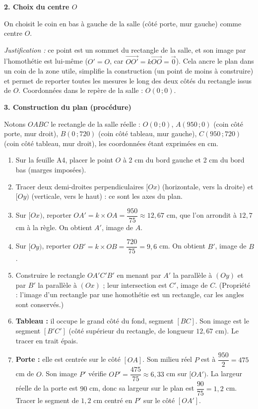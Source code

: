 \documentclass[11pt]{article}
\begin{document}
\begin{exoresolu}
\textbf{2. Choix du centre $O$}
\par On choisit le coin en bas à gauche de la salle (côté porte, mur gauche) comme centre $O$.
\par \emph{Justification :} ce point est un sommet du rectangle de la salle, et son image par l'homothétie est lui-même ($O' = O$, car $\overrightarrow{OO'} = k\overrightarrow{OO} = \vec{0}$). Cela \og ancre \fg{} le plan dans un coin de la zone utile, simplifie la construction (un point de moins à construire) et permet de reporter toutes les mesures le long des deux côtés du rectangle issus de $O$. Coordonnées dans le repère de la salle : $O(0\,;0)$.

\textbf{3. Construction du plan (procédure)}
\par Notons $OABC$ le rectangle de la salle réelle : $O(0\,;0)$, $A(950\,;0)$ (coin côté porte, mur droit), $B(0\,;720)$ (coin côté tableau, mur gauche), $C(950\,;720)$ (coin côté tableau, mur droit), les coordonnées étant exprimées en cm.
\begin{enumerate}
    \item Sur la feuille A4, placer le point $O$ à 2 cm du bord gauche et 2 cm du bord bas (marges imposées).
    \item Tracer deux demi-droites perpendiculaires $[Ox)$ (horizontale, vers la droite) et $[Oy)$ (verticale, vers le haut) : ce sont les axes du plan.
    \item Sur $[Ox)$, reporter $OA' = k \times OA = \dfrac{950}{75} \approx 12,67$ cm, que l'on arrondit à $12,7$ cm à la règle. On obtient $A'$, image de $A$.
    \item Sur $[Oy)$, reporter $OB' = k \times OB = \dfrac{720}{75} = 9,6$ cm. On obtient $B'$, image de $B$.
    \item Construire le rectangle $OA'C'B'$ en menant par $A'$ la parallèle à $(Oy)$ et par $B'$ la parallèle à $(Ox)$ ; leur intersection est $C'$, image de $C$. (Propriété : l'image d'un rectangle par une homothétie est un rectangle, car les angles sont conservés.)
    \item \textbf{Tableau :} il occupe le grand côté du fond, segment $[BC]$. Son image est le segment $[B'C']$ (côté supérieur du rectangle, de longueur $12,67$ cm). Le tracer en trait épais.
    \item \textbf{Porte :} elle est centrée sur le côté $[OA]$. Son milieu réel $P$ est à $\dfrac{950}{2} = 475$ cm de $O$. Son image $P'$ vérifie $OP' = \dfrac{475}{75} \approx 6,33$ cm sur $[OA')$. La largeur réelle de la porte est $90$ cm, donc sa largeur sur le plan est $\dfrac{90}{75} = 1,2$ cm. Tracer le segment de $1,2$ cm centré en $P'$ sur le côté $[OA']$.

\end{enumerate}
\end{exoresolu}
\end{document}
